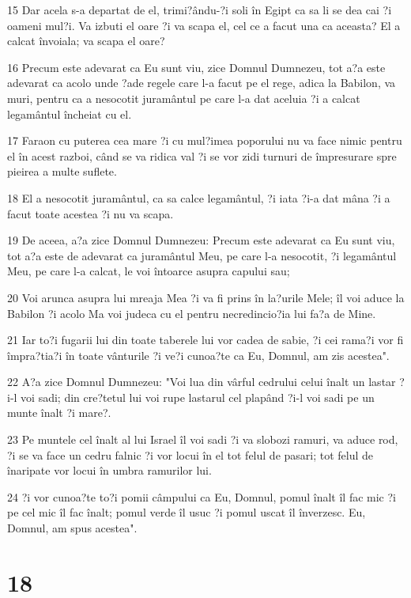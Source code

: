 \par 15 Dar acela s-a departat de el, trimi?ându-?i soli în Egipt ca sa li se dea cai ?i oameni mul?i. Va izbuti el oare ?i va scapa el, cel ce a facut una ca aceasta? El a calcat învoiala; va scapa el oare?
\par 16 Precum este adevarat ca Eu sunt viu, zice Domnul Dumnezeu, tot a?a este adevarat ca acolo unde ?ade regele care l-a facut pe el rege, adica la Babilon, va muri, pentru ca a nesocotit juramântul pe care l-a dat aceluia ?i a calcat legamântul încheiat cu el.
\par 17 Faraon cu puterea cea mare ?i cu mul?imea poporului nu va face nimic pentru el în acest razboi, când se va ridica val ?i se vor zidi turnuri de împresurare spre pieirea a multe suflete.
\par 18 El a nesocotit juramântul, ca sa calce legamântul, ?i iata ?i-a dat mâna ?i a facut toate acestea ?i nu va scapa.
\par 19 De aceea, a?a zice Domnul Dumnezeu: Precum este adevarat ca Eu sunt viu, tot a?a este de adevarat ca juramântul Meu, pe care l-a nesocotit, ?i legamântul Meu, pe care l-a calcat, le voi întoarce asupra capului sau;
\par 20 Voi arunca asupra lui mreaja Mea ?i va fi prins în la?urile Mele; îl voi aduce la Babilon ?i acolo Ma voi judeca cu el pentru necredincio?ia lui fa?a de Mine.
\par 21 Iar to?i fugarii lui din toate taberele lui vor cadea de sabie, ?i cei rama?i vor fi împra?tia?i în toate vânturile ?i ve?i cunoa?te ca Eu, Domnul, am zis acestea".
\par 22 A?a zice Domnul Dumnezeu: "Voi lua din vârful cedrului celui înalt un lastar ?i-l voi sadi; din cre?tetul lui voi rupe lastarul cel plapând ?i-l voi sadi pe un munte înalt ?i mare?.
\par 23 Pe muntele cel înalt al lui Israel îl voi sadi ?i va slobozi ramuri, va aduce rod, ?i se va face un cedru falnic ?i vor locui în el tot felul de pasari; tot felul de înaripate vor locui în umbra ramurilor lui.
\par 24 ?i vor cunoa?te to?i pomii câmpului ca Eu, Domnul, pomul înalt îl fac mic ?i pe cel mic îl fac înalt; pomul verde îl usuc ?i pomul uscat îl înverzesc. Eu, Domnul, am spus acestea".

\chapter{18}

